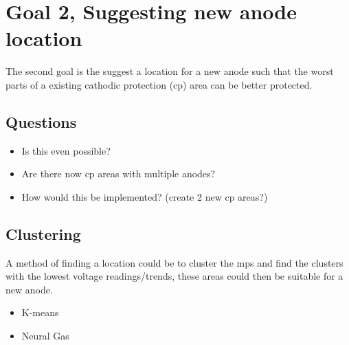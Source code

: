\documentclass{article}
\begin{document}
\section{Goal 2, Suggesting new anode location}

The second goal is the suggest a location for a new anode such that the worst parts of a existing cathodic protection (cp) area can be better protected.

\subsection{Questions}

\begin{itemize}
\item Is this even possible?
\item Are there now cp areas with multiple anodes?
\item How would this be implemented? (create 2 new cp areas?)
\end{itemize}

\subsection{Clustering}

A method of finding a location could be to cluster the mps and find the clusters with the lowest voltage readings/trends, these areas could then be suitable for a new anode.

\begin{itemize}
\item K-means
\item Neural Gas
\end{itemize}
\end{document}
